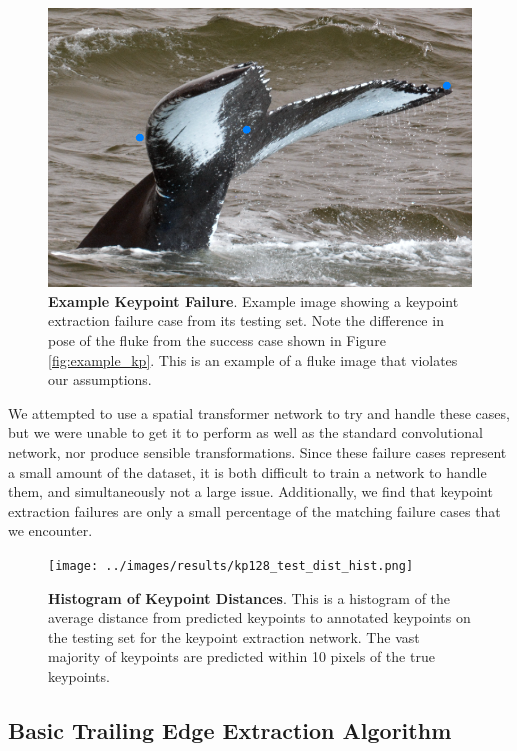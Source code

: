 \begin{figure}[t]%
\centering
\includegraphics[width=1.0\textwidth]{../images/aid1323_kpoverlay.png}
\caption{\textbf{Example Keypoint Failure}. Example image showing a keypoint extraction failure case from its testing set. Note the difference in pose of the fluke from the success case shown in Figure \ref{fig:example_kp}. This is an example of a fluke image that violates our assumptions.}
\label{fig:example_kp_failure}
\end{figure}



We attempted to use a spatial transformer network \cite{jaderberg2015spatial} to try and handle these cases, but we were unable to get it to perform as well as the standard convolutional network, nor produce sensible transformations.
Since these failure cases represent a small amount of the dataset, it is both difficult to train a network to handle them, and simultaneously not a large issue.
Additionally, we find that keypoint extraction failures are only a small percentage of the matching failure cases that we encounter.

\begin{figure}[t]%
\centering
\texttt{[image: ../images/results/kp128\_test\_dist\_hist.png]}
\caption{\textbf{Histogram of Keypoint Distances}. This is a histogram of the average distance from predicted keypoints to annotated keypoints on the testing set for the keypoint extraction network. The vast majority of keypoints are predicted within 10 pixels of the true keypoints.}
\label{fig:kp128_dist_hist}
\end{figure}



\subsection{Basic Trailing Edge Extraction Algorithm}
\label{sec:basic_te}

